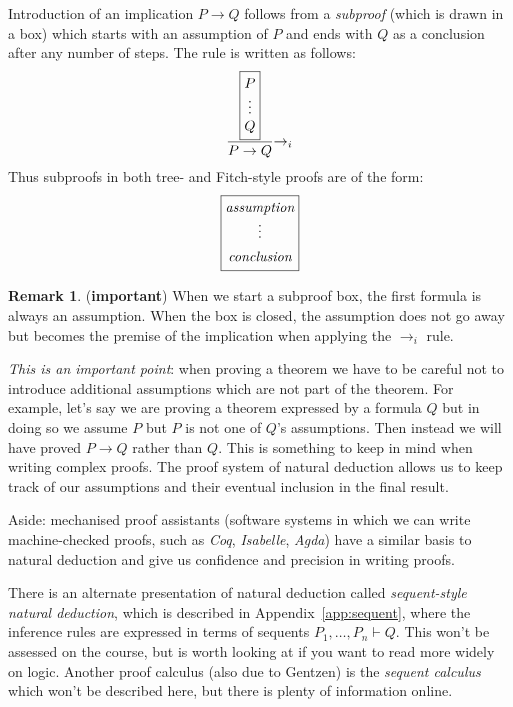 \documentclass{article}
\theoremstyle{definition}
\newtheorem*{remark}{Remark}
\begin{document}
Introduction of an implication $P \rightarrow Q$ follows from a
\emph{subproof} (which is drawn in a box) which starts with an
assumption of $P$ and ends with $Q$ as a conclusion after any number
of steps. The rule is written as follows:
%
\begin{align*}
\setlength{\arraycolsep}{0em}
\dfrac{\fbox{$\begin{array}{c} P \\ \vdots \\ Q\end{array}$}}
      {P \rightarrow Q} {\rightarrow_i}
\end{align*}
%
Thus subproofs in both tree- and Fitch-style proofs
are of the form:
%
\begin{equation*}
\setlength{\arraycolsep}{0em}
\fbox{$\begin{array}{c} \textit{assumption} \\ \vdots \\[0.5em]
         \textit{conclusion} \end{array}$}
\end{equation*}
%
\begin{remark} (\textbf{important})
%
  When we start a subproof box, the first formula is always an
  assumption. When the box is closed, the assumption does not go away
  but becomes the premise of the implication when applying the
  $\rightarrow_i$ rule.

  \emph{This is an important point}: when proving a theorem we
  have to be careful not to introduce additional assumptions which are
  not part of the theorem. For example, let's say we are proving a
  theorem expressed by a formula $Q$ but in doing so we assume $P$
  but $P$ is not one of $Q$'s assumptions.  Then
  instead we will have proved $P \rightarrow Q$ rather than $Q$.  This
  is something to keep in mind when writing complex
  proofs. The proof system of natural deduction allows us to keep
  track of our assumptions and their eventual inclusion in the final
  result.

  Aside: mechanised proof assistants (software systems in which we
  can write machine-checked proofs, such as \emph{Coq},
  \emph{Isabelle}, \emph{Agda}) have a similar basis to
  natural deduction and give us confidence and precision in writing proofs.
\end{remark}
%
There is an alternate presentation of natural deduction called
\emph{sequent-style natural deduction}, which is described in
Appendix~\ref{app:sequent}, where the inference rules are expressed in
terms of sequents $P_1, \ldots, P_n \vdash Q$. This won't be assessed
on the course, but is worth looking at if you want to read more widely
on logic. Another proof calculus (also due to Gentzen) is the
\emph{sequent calculus} which won't be described here, but there is
plenty of information online.
\end{document}
